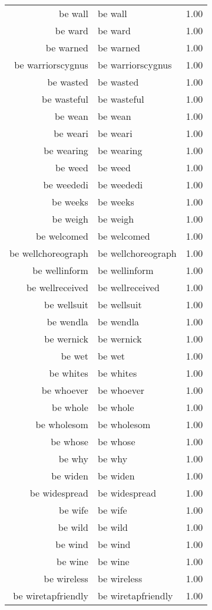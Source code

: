 \begin{table}[ht]
\begin{tabular}{rlr}
  be wall & be wall & 1.00 \\ 
  be ward & be ward & 1.00 \\ 
  be warned & be warned & 1.00 \\ 
  be warriorscygnus & be warriorscygnus & 1.00 \\ 
  be wasted & be wasted & 1.00 \\ 
  be wasteful & be wasteful & 1.00 \\ 
  be wean & be wean & 1.00 \\ 
  be weari & be weari & 1.00 \\ 
  be wearing & be wearing & 1.00 \\ 
  be weed & be weed & 1.00 \\ 
  be weededi & be weededi & 1.00 \\ 
  be weeks & be weeks & 1.00 \\ 
  be weigh & be weigh & 1.00 \\ 
  be welcomed & be welcomed & 1.00 \\ 
  be wellchoreograph & be wellchoreograph & 1.00 \\ 
  be wellinform & be wellinform & 1.00 \\ 
  be wellreceived & be wellreceived & 1.00 \\ 
  be wellsuit & be wellsuit & 1.00 \\ 
  be wendla & be wendla & 1.00 \\ 
  be wernick & be wernick & 1.00 \\ 
  be wet & be wet & 1.00 \\ 
  be whites & be whites & 1.00 \\ 
  be whoever & be whoever & 1.00 \\ 
  be whole & be whole & 1.00 \\ 
  be wholesom & be wholesom & 1.00 \\ 
  be whose & be whose & 1.00 \\ 
  be why & be why & 1.00 \\ 
  be widen & be widen & 1.00 \\ 
  be widespread & be widespread & 1.00 \\ 
  be wife & be wife & 1.00 \\ 
  be wild & be wild & 1.00 \\ 
  be wind & be wind & 1.00 \\ 
  be wine & be wine & 1.00 \\ 
  be wireless & be wireless & 1.00 \\ 
  be wiretapfriendly & be wiretapfriendly & 1.00 \\ 

\end{tabular}
\end{table}
